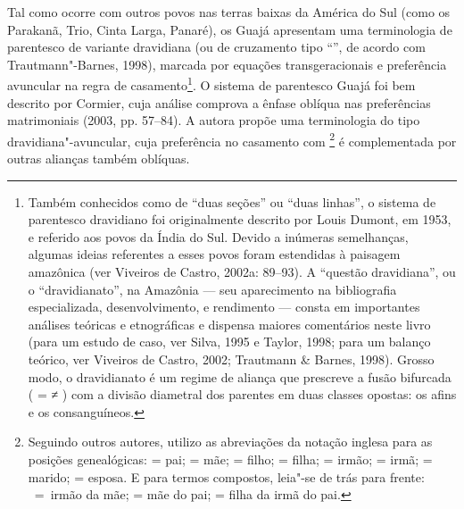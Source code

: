 Tal como ocorre com outros povos nas terras baixas da América do Sul
(como os Parakanã, Trio, Cinta Larga, Panaré), os Guajá apresentam uma
terminologia de parentesco de variante dravidiana (ou de cruzamento tipo
``'', de acordo com Trautmann"-Barnes, 1998), marcada por equações
transgeracionais e preferência avuncular na regra de casamento\footnote{Também
  conhecidos como de ``duas seções'' ou ``duas linhas'', o sistema de
  parentesco dravidiano foi originalmente descrito por Louis Dumont, em
  1953, e referido aos povos da Índia do Sul. Devido a inúmeras
  semelhanças, algumas ideias referentes a esses povos foram estendidas
  à paisagem amazônica (ver Viveiros de Castro, 2002a: 89--93). A
  ``questão dravidiana'', ou o ``dravidianato'', na Amazônia --- seu
  aparecimento na bibliografia especializada, desenvolvimento, e
  rendimento --- consta em importantes análises teóricas e etnográficas e
  dispensa maiores comentários neste livro (para um estudo de caso, ver
  Silva, 1995 e Taylor, 1998; para um balanço teórico, ver Viveiros de
  Castro, 2002; Trautmann \& Barnes, 1998). Grosso modo, o dravidianato
  é um regime de aliança que prescreve a fusão bifurcada ( =  ≠ )
  com a divisão diametral dos parentes em duas classes opostas: os afins
  e os consanguíneos.}. O sistema de parentesco Guajá foi bem descrito
por Cormier, cuja análise comprova a ênfase oblíqua nas preferências
matrimoniais (2003, pp. 57--84). A autora propõe uma terminologia do tipo
dravidiana"-avuncular, cuja preferência no casamento com \footnote{Seguindo
  outros autores, utilizo as abreviações da notação inglesa para as
  posições genealógicas:  = pai;  = mãe;  = filho;  = filha;  =
  irmão;  = irmã;  = marido;  = esposa. E para termos compostos,
  leia"-se de trás para frente: ~=~irmão da mãe;  = mãe do pai;  =
  filha da irmã do pai.} é complementada por outras alianças também
oblíquas.

